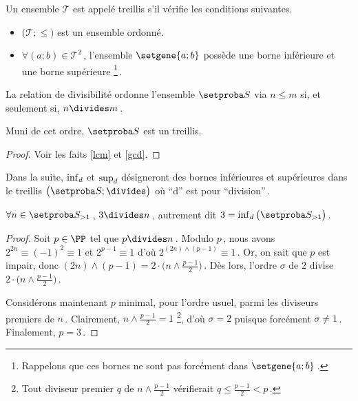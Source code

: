Un ensemble $\mathcal{T}$ est appelé treillis s'il vérifie les conditions suivantes.
%
\begin{itemize}
	\item $\big( \mathcal{T} ; \leq \big)$ est un ensemble ordonné.

	\item $\forall (a ; b) \in \mathcal{T}^2$\,, l'ensemble $\setgene{a ; b}$ possède une borne inférieure et une borne supérieure
	\footnote{
		Rappelons que ces bornes ne sont pas forcément dans $\setgene{a ; b}$\,.
	}\,. 
\end{itemize}




\begin{fact}
	La relation de divisibilité ordonne l'ensemble $\ourset$ via $n  \leq m$ si, et seulement si, $n \divides m$\,.
	
	\medskip
	
	Muni de cet ordre, $\ourset$ est un treillis.
\end{fact}

\begin{proof}
	Voir les faits \ref{lcm} et \ref{gcd}.
\end{proof}


Dans la suite, $\inf_d$ et $\sup_d$ désigneront des bornes inférieures et supérieures dans le treillis $\big( \ourset ; \divides \big)$ où \enquote{d} est pour \enquote{division}\,.




\begin{fact}
	$\forall n \in \ourset_{>1}$\,, $3 \divides n$\,, autrement dit $3 = \dinf \big( \ourset_{>1} \big)$\,.
\end{fact}

\begin{proof}
	Soit $p \in \PP$ tel que $p \divides n$\,.
	Modulo $p$\,, nous avons
	$2^{2n} \equiv (- 1)^2 \equiv 1$
	et
	$2^{p-1} \equiv 1$
	d'où
	$2^{(2n) \wedge (p-1)} \equiv 1$\,.
	Or, on sait que $p$ est impair, donc $(2n) \wedge (p-1) = 2 \cdot \big( n \wedge \frac{p-1}{2} \big)$\,.
	Dès lors, l'ordre $\sigma$ de $2$ divise $2 \cdot \big( n \wedge \frac{p-1}{2} \big)$\,.
	
	\medskip
	
	Considérons maintenant $p$ minimal, pour l'ordre usuel, parmi les diviseurs premiers de $n$\,.
	Clairement, $n \wedge \frac{p-1}{2} = 1$
	\footnote{
		Tout diviseur premier $q$ de $n \wedge \frac{p-1}{2}$ vérifierait $q \leq \frac{p-1}{2} < p$\,.
	},
	d'où $\sigma = 2$ puisque forcément $\sigma \neq 1$\,.
	Finalement, $p = 3$\,.
\end{proof}



